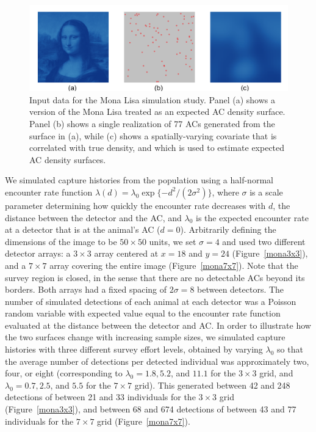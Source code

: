 \documentclass[useAMS,usenatbib,referee]{biom}
\begin{document}
\begin{figure}[htbp]
\centering
\includegraphics[width=1\textwidth]{mona_inputdata.png}
\caption{Input data for the Mona Lisa simulation study. Panel (a) shows a version of the Mona Lisa treated as an expected AC density surface. Panel (b) shows a single realization of 77 ACs generated from the surface in (a), while (c) shows a spatially-varying covariate that is correlated with true density, and which is used to estimate expected AC density surfaces.}
\label{mlinputs}
\end{figure}

We simulated capture histories from the population using a half-normal encounter rate function $\lambda(d) = \lambda_0\exp\{-d^2/(2\sigma^2)\}$, where $\sigma$ is a scale parameter determining how quickly the encounter rate decreases with $d$, the distance between the detector and the AC, and $\lambda_0$ is the expected encounter rate at a detector that is at the animal's AC ($d=0$). Arbitrarily defining the dimensions of the image to be $50\times 50$ units, we set $\sigma=4$ and used two different detector arrays: a $3\times3$ array centered at $x=18$ and $y=24$ (Figure~\ref{mona3x3}), and a $7\times 7$ array covering the entire image (Figure~\ref{mona7x7}). Note that the survey region is closed, in the sense that there are no detectable ACs beyond its borders. Both arrays had a fixed spacing of $2\sigma=8$ between detectors. The number of simulated detections of each animal at each detector was a Poisson random variable with expected value equal to the encounter rate function evaluated at the distance between the detector and AC. In order to illustrate how the two surfaces change with increasing sample sizes, we simulated capture histories with three different survey effort levels, obtained by varying $\lambda_0$ so that the average number of detections per detected individual was approximately two, four, or eight (corresponding to $\lambda_0=1.8, 5.2$, and $11.1$ for the $3\times 3$ grid, and $\lambda_0=0.7, 2.5$, and $5.5$ for the $7\times 7$ grid). This generated between 42 and 248 detections of between 21 and 33 individuals for the $3\times 3$ grid (Figure~\ref{mona3x3}), and between 68 and 674 detections of between 43 and 77 individuals for the $7\times 7$ grid (Figure~\ref{mona7x7}).
\end{document}
